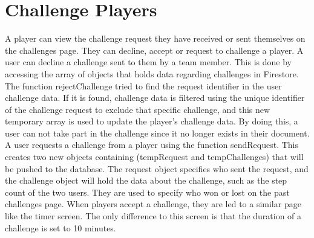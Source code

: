 \documentclass{l4proj}
\begin{document}
\section{Challenge Players}
A player can view the challenge request they have received or sent themselves on the challenges page. They can decline, accept or request to challenge a player. A user can decline a challenge sent to them by a team member. This is done by accessing the array of objects that holds data regarding challenges in Firestore. The function rejectChallenge tried to find the request identifier in the user challenge data. If it is found, challenge data is filtered using the unique identifier of the challenge request to exclude that specific challenge, and this new temporary array is used to update the player's challenge data. By doing this, a user can not take part in the challenge since it no longer exists in their document. A user requests a challenge from a player using the function sendRequest. This creates two new objects containing (tempRequest and tempChallenges) that will be pushed to the database. The request object specifies who sent the request, and the challenge object will hold the data about the challenge, such as the step count of the two users. They are used to specify who won or lost on the past challenges page. When players accept a challenge, they are led to a similar page like the timer screen. The only difference to this screen is that the duration of a challenge is set to 10 minutes. 
\end{document}
